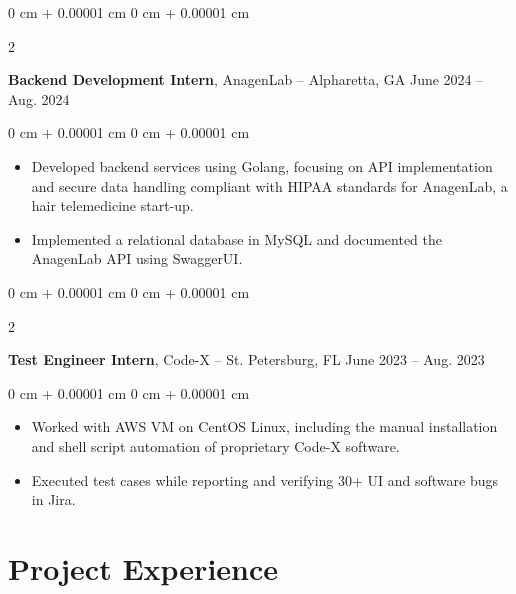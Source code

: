 \documentclass[10pt, letterpaper]{article}
\newenvironment{highlights}{
    \begin{itemize}[
        topsep=0.10 cm,
        parsep=0.10 cm,
        partopsep=0pt,
        itemsep=0pt,
        leftmargin=0 cm + 10pt
    ]
}{
    \end{itemize}
} %
\newenvironment{onecolentry}{
    \begin{adjustwidth}{
        0 cm + 0.00001 cm
    }{
        0 cm + 0.00001 cm
    }
}{
    \end{adjustwidth}
} %
\newenvironment{twocolentry}[2][]{
    \onecolentry
    \def\secondColumn{#2}
    \setcolumnwidth{\fill, 4.5 cm}
    \begin{paracol}{2}
}{
    \switchcolumn \raggedleft \secondColumn
    \end{paracol}
    \endonecolentry
} %
\begin{document}
        \vspace{0.2 cm}

        \begin{twocolentry}{
            June 2024 – Aug. 2024
        }
            \textbf{Backend Development Intern}, AnagenLab -- Alpharetta, GA\end{twocolentry}

        \vspace{0.10 cm}
        \begin{onecolentry}
            \begin{highlights}
                \item 
Developed backend services using Golang, focusing on API implementation and secure data handling compliant with HIPAA standards for AnagenLab, a hair telemedicine start-up. 

                \item 
Implemented a relational database in MySQL and documented the AnagenLab API using SwaggerUI.

            \end{highlights}
        \end{onecolentry}
        
        \vspace{0.2 cm}

        \begin{twocolentry}{
            June 2023 – Aug. 2023
        }
            \textbf{Test Engineer Intern}, Code-X -- St. Petersburg, FL\end{twocolentry}

        \vspace{0.10 cm}
        \begin{onecolentry}
            \begin{highlights}
                \item Worked with AWS VM on CentOS Linux, including the manual installation and shell script automation of proprietary Code-X software. 


                \item Executed test cases while reporting and verifying 30+ UI and software bugs in Jira. 

            \end{highlights}
        \end{onecolentry}


    
    \section{Project Experience}
\end{document}

